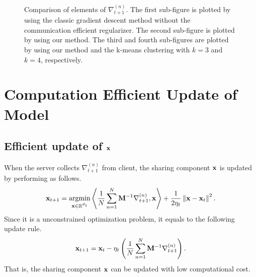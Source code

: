 \documentclass[journal]{IEEEtran}
\begin{document}
\begin{figure}[!]
\caption{Comparison of elements of $\nabla_{t+1}^{(n)}$. The first sub-figure is plotted by using the classic gradient descent method without the communication efficient regularizer. The second sub-figure is plotted by using our method. The third and fourth sub-figures are plotted by using our method and the k-means clustering with $k=3$ and $k=4$, respectively.  }
\label{figure_illustrative_communication_efficient_clustering}
\end{figure}

\section{Computation Efficient Update of Model}

\subsection{Efficient update of ${\bf x}$} 

When the server collects $\nabla_{t+1}^{(n)}$ from client, the sharing component ${\bf x}$ is updated by performing as follows.
\begin{align}
\nonumber
\x_{t+1} = \argmin_{\substack{\x\in\RR^{d_1}}}  \lrangle{\frac{1}{N}\sum_{n=1}^N\M^{-1}\nabla_{t+1}^{(n)}, \x} + \frac{1}{2\eta_t}\lrnorm{\x - \x_t}^2.
\end{align} Since it is a unconstrained optimization problem, it equals to the following update rule.
\begin{align}
\nonumber
{\bf x}_{t+1} = {\bf x}_t - \eta_t \left( \frac{1}{N}\sum_{n=1}^N{\bf M}^{-1}\nabla_{t+1}^{(n)} \right).
\end{align} That is, the sharing component ${\bf x}$ can be updated with low computational cost.
\end{document}
